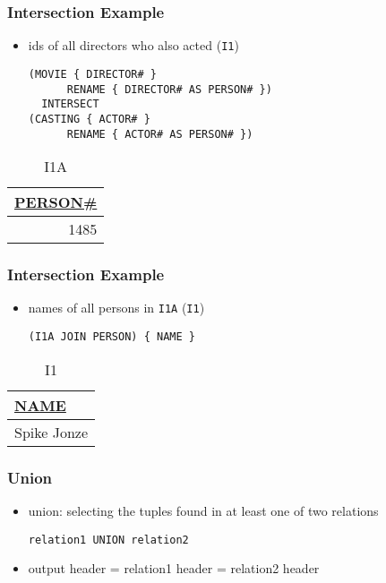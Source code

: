 \documentclass[dvipsnames]{beamer}
\theoremstyle{plain}
\begin{document}
\begin{frame}[fragile]
  \frametitle{Intersection Example}

  \begin{itemize}
    \item ids of all directors who also acted (\texttt{I1})
    \begin{lstlisting}
(MOVIE { DIRECTOR# }
      RENAME { DIRECTOR# AS PERSON# })
  INTERSECT
(CASTING { ACTOR# }
      RENAME { ACTOR# AS PERSON# })
    \end{lstlisting}
  \end{itemize}

  \vspace{-10pt}
  \begin{tiny}
  \begin{table}
    \caption{I1A}
    \begin{tabular}{|r|}\hline
\underline{PERSON\#}\\[2pt]\hline\hline
                1485\\\hline
    \end{tabular}
  \end{table}
  \end{tiny}
\end{frame}

\begin{frame}[fragile]
  \frametitle{Intersection Example}

  \begin{itemize}
    \item names of all persons in \texttt{I1A} (\texttt{I1})
    \begin{lstlisting}
(I1A JOIN PERSON) { NAME }
    \end{lstlisting}
  \end{itemize}

  \vspace{-10pt}
  \begin{tiny}
  \begin{table}
    \caption{I1}
    \begin{tabular}{|l|}\hline
\underline{NAME}\\[2pt]\hline\hline
Spike Jonze     \\\hline
    \end{tabular}
  \end{table}
  \end{tiny}
\end{frame}

\begin{frame}[fragile]
  \frametitle{Union}

  \begin{itemize}
    \item \alert{union}: selecting the tuples found in at least one of two
      relations
    \begin{lstlisting}
relation1 UNION relation2
    \end{lstlisting}

    \medskip
    \item output header = relation1 header = relation2 header
  \end{itemize}
\end{frame}
\end{document}
